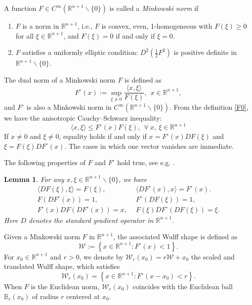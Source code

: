 \documentclass[11pt,reqno]{amsart}
\newtheorem{lemma}[proposition]{Lemma}
\theoremstyle{definition}
\theoremstyle{remark}
\newtheorem*{unnumremark}{Remark}
\numberwithin{equation}{section}
\begin{document}
	A function $F\in C^{\infty}\left(\mathbb{R}^{n+1}\backslash\{0\}\right)$ is called a \textit{Minkowski norm} if
    \begin{enumerate}
        \item $F$ is a norm in $\mathbb{R}^{n+1}$, i.e., $F$ is convex, even, $1$-homogeneous with $F(\xi)\geq 0$ for all $\xi\in \mathbb{R}^{n+1}$, and $F(\xi)=0$ if and only if $\xi=0$.
        \item $F$ satisfies a uniformly elliptic condition: $D^2\left( \frac{1}{2}F^2 \right)$ is positive definite in $\mathbb{R}^{n+1}\backslash \{0\}$.
    \end{enumerate}
    The dual norm of a Minkowski norm  $F$ is defined as
	\begin{equation}
		F^{\circ}(x):= \sup\limits_{\xi\neq 0} \dfrac{\langle x,\xi \rangle}{F(\xi)},\ \ x\in\mathbb{R}^{n+1},
		\label{F0}
	\end{equation}
	and $F^{\circ}$ is also a Minkowski norm in $C^{\infty}\left( \mathbb{R}^{n+1}\backslash \{0\} \right)$. From the definition \eqref{F0}, we have the anisotropic Cauchy--Schwarz inequality:
	\begin{equation}
		\langle x,\xi \rangle\leq F^{\circ}(x)F(\xi),\ \ \forall\ x,\ \xi\in\mathbb{R}^{n+1}
		\label{anisocauchy}
	\end{equation}
	If $x\neq0$ and $\xi\neq0$, equality holds if and only if $x=F^{\circ}(x)DF(\xi)$ and $\xi=F(\xi)DF^{\circ}(x)$. The cases in which one vector vanishes are immediate.
	
	The following properties of $F$ and $F^{\circ}$ hold true, see e.g. \cite{BC18,CS09,Xia12}.
	\begin{lemma}
		For any $x,\xi\in\mathbb{R}^{n+1}\backslash \{0\}$, we have
		\begin{align}
			\langle DF(\xi),\xi \rangle=F(\xi),&\ \ \langle DF^{\circ}(x),x \rangle=F^{\circ}(x). \label{fprop1}\\
			F\left( DF^{\circ} (x)\right)=1,&\ \ F^{\circ} \left( DF(\xi) \right) = 1, \\
			F^{\circ}(x) DF\left( DF^{\circ}(x) \right) = x,&\ \  F(\xi) DF^{\circ} \left( DF(\xi) \right) = \xi.\label{fprop3}
		\end{align}
		Here $D$ denotes the standard gradient operator in $\mathbb{R}^{n+1}$.
	\end{lemma}
	
	Given a Minkowski norm $F$ in $\mathbb{R}^{n+1}$, the associated Wulff shape is defined as
	\begin{equation*}
		\mathcal{W}:=\left\lbrace x\in\mathbb{R}^{n+1}:F^\circ(x)<1 \right\rbrace.
	\end{equation*}
	For $x_0\in \mathbb{R}^{n+1}$ and $r>0$, we denote by $\mathcal{W}_r(x_0)=r\mathcal{W}+x_0$ the scaled and translated Wulff shape, which satisfies
	\begin{equation*}
		\mathcal{W}_r(x_0)=\left\lbrace x\in\mathbb{R}^{n+1}:F^\circ(x-x_0)<r \right\rbrace.
	\end{equation*}
	When $F$ is the Euclidean norm, $\mathcal{W}_r(x_0)$ coincides with the Euclidean ball $\mathbb{B}_r(x_0)$ of radius $r$ centered at $x_0$.
	
\end{document}
